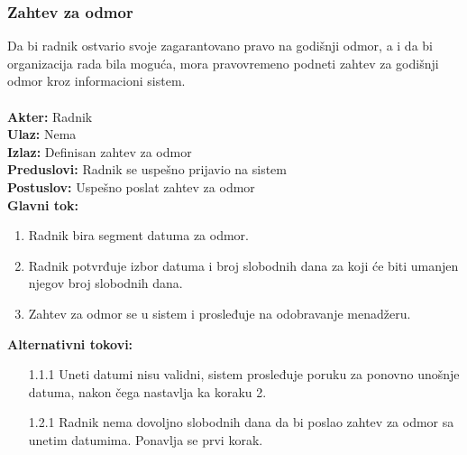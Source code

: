 \documentclass{article}
\begin{document}
\subsubsection{Zahtev za odmor}
Da bi radnik ostvario svoje zagarantovano pravo na godišnji odmor, a i da bi organizacija rada bila moguća, mora pravovremeno podneti zahtev za godišnji odmor kroz informacioni sistem.\\\\
\textbf{Akter:} Radnik\\
\textbf{Ulaz:} Nema\\
\textbf{Izlaz:} Definisan zahtev za odmor\\
\textbf{Preduslovi:} Radnik se uspešno prijavio na sistem\\
\textbf{Postuslov:} Uspešno poslat zahtev za odmor\\
\textbf{Glavni tok:}
\begin{enumerate}
\item Radnik bira segment datuma za odmor.
\item Radnik potvrđuje izbor datuma i broj slobodnih dana za koji će biti umanjen njegov broj slobodnih dana.
\item Zahtev za odmor se u sistem i prosleđuje na odobravanje menadžeru.
\end{enumerate}
\textbf{Alternativni tokovi:} \\
\begin{itemize}
\item [1.1.1] Uneti datumi nisu validni, sistem prosleđuje poruku za ponovno unošnje datuma, nakon čega nastavlja ka koraku 2.
\item [1.2.1] Radnik nema dovoljno slobodnih dana da bi poslao zahtev za odmor sa unetim datumima. Ponavlja se prvi korak.
\end{itemize}
\end{document}
